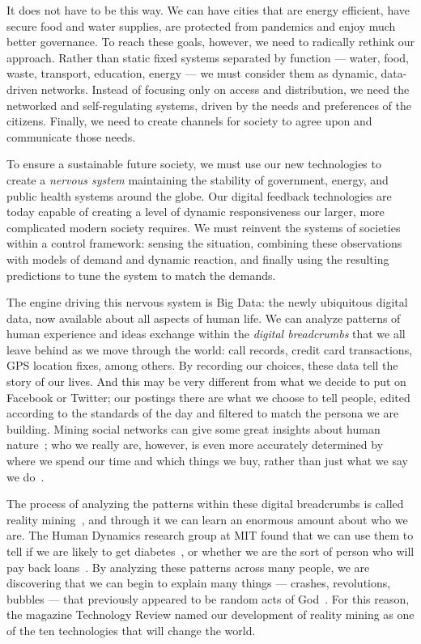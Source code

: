 It does not have to be this way.
We can have cities that are energy efficient, have secure food and water supplies, are protected from pandemics and enjoy much better governance.
To reach these goals, however, we need to radically rethink our approach.
Rather than static fixed systems separated by function --- water, food, waste, transport, education, energy --- we must consider them as dynamic, data-driven networks.
Instead of focusing only on access and distribution, we need the networked and self-regulating systems, driven by the needs and preferences of the citizens.
Finally, we need to create channels for society to agree upon and communicate those needs. 

To ensure a sustainable future society, we must use our new technologies to create a \emph{nervous system} maintaining the stability of government, energy, and public health systems around the globe.
Our digital feedback technologies are today capable of creating a level of dynamic responsiveness our larger, more complicated modern society requires.
We must reinvent the systems of societies within a control framework: sensing the situation, combining these observations with models of demand and dynamic reaction, and finally using the resulting predictions to tune the system to match the demands.

The engine driving this nervous system is Big Data: the newly ubiquitous digital data, now available about all aspects of human life.
We can analyze patterns of human experience and ideas exchange within the \emph{digital breadcrumbs} that we all leave behind as we move through the world: call records, credit card transactions, GPS location fixes, among others.
By recording our choices, these data tell the story of our lives.
And this may be very different from what we decide to put on Facebook or Twitter; our postings there are what we choose to tell people, edited according to the standards of the day and filtered to match the persona we are building.
Mining social networks can give some great insights about human nature~\cite{aral2012identifying,mislove2010pulse, vitak2011s}; who we really are, however, is even more accurately determined by where we spend our time and which things we buy, rather than just what we say we do~\cite{madrigal2013dark}.

The process of analyzing the patterns within these digital breadcrumbs is called reality mining~\cite{eagle2006reality,pentland2009reality}, and through it we can learn an enormous amount about who we are.
The Human Dynamics research group at MIT found that we can use them to tell if we are likely to get diabetes~\cite{pentland2009using}, or whether we are the sort of person who will pay back loans~\cite{singh2013classifying}.
By analyzing these patterns across many people, we are discovering that we can begin to explain many things --- crashes, revolutions, bubbles --- that previously appeared to be random acts of God~\cite{pan2012decoding}.
For this reason, the magazine Technology Review named our development of reality mining as one of the ten technologies that will change the world\cite{greene2008reality}. 

